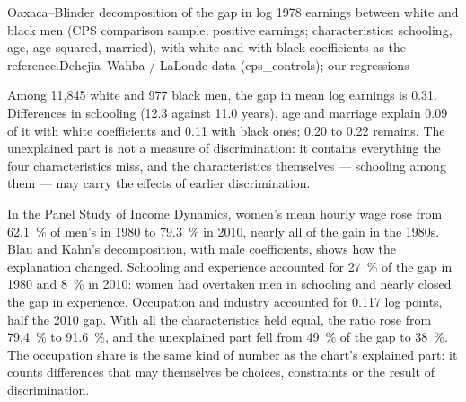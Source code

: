 \begin{omchart}{Oaxaca--Blinder decomposition of the gap in log 1978 earnings between
white and black men (CPS comparison sample, positive earnings; characteristics:
schooling, age, age squared, married), with white and with black coefficients as
the reference.}{Dehejia--Wahba / LaLonde data (cps\_controls); our regressions}
\end{omchart}

Among 11{,}845 white and 977 black men, the gap in mean log earnings is 0.31. Differences in
schooling (12.3 against 11.0 years), age and marriage explain 0.09 of it with white
coefficients and 0.11 with black ones; 0.20 to 0.22 remains. The unexplained part is not a
measure of discrimination: it contains everything the four characteristics miss,
and the characteristics themselves --- schooling among them --- may carry the effects
of earlier discrimination.

\begin{record}
In the Panel Study of Income Dynamics, women's mean hourly wage rose from 62.1~\% of
men's in 1980 to 79.3~\% in 2010, nearly all of the gain in the 1980s. Blau and Kahn's
decomposition, with male coefficients, shows how the explanation changed. Schooling
and experience accounted for 27~\% of the gap in 1980 and 8~\% in 2010: women had
overtaken men in schooling and nearly closed the gap in experience. Occupation and
industry accounted for 0.117 log points, half the 2010 gap. With all the
characteristics held equal, the ratio rose from 79.4~\% to 91.6~\%, and the
unexplained part fell from 49~\% of the gap to 38~\%. %
The occupation share is the same kind of number as the chart's explained part: it
counts differences that may themselves be choices, constraints or the result of
discrimination.
\end{record}

